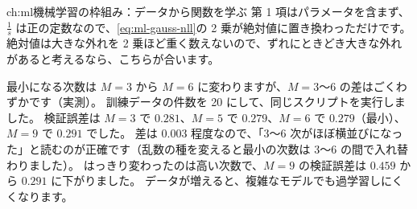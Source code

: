 \begin{answers}{ch:ml}{機械学習の枠組み：データから関数を学ぶ}
第 1 項はパラメータを含まず、$\frac{1}{s}$ は正の定数なので、\eqref{eq:ml-gauss-nll}の 2 乗が絶対値に置き換わっただけです。
絶対値は大きな外れを 2 乗ほど重く数えないので、ずれにときどき大きな外れがあると考えるなら、こちらが合います。
\item 最小になる次数は $M=3$ から $M=6$ に変わりますが、$M=3$〜$6$ の差はごくわずかです（実測）。
訓練データの件数を 20 にして、同じスクリプトを実行しました。
検証誤差は $M=3$ で $0.281$、$M=5$ で $0.279$、$M=6$ で $0.279$（最小）、$M=9$ で $0.291$ でした。
差は $0.003$ 程度なので、「3〜6 次がほぼ横並びになった」と読むのが正確です（乱数の種を変えると最小の次数は 3〜6 の間で入れ替わりました）。
はっきり変わったのは高い次数で、$M=9$ の検証誤差は $0.459$ から $0.291$ に下がりました。
データが増えると、複雑なモデルでも過学習しにくくなります。
\end{answers}
